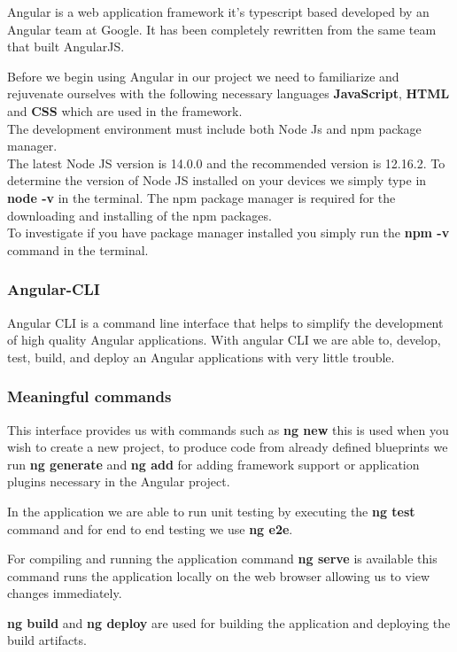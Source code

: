 \documentclass[a4paper,12pt]{report}
\begin{document}
Angular is a web application framework it's typescript based developed by an Angular team at Google.
It has been completely rewritten from the same team that built AngularJS.

Before we begin using Angular in our project we need to familiarize and rejuvenate ourselves with the following necessary languages \textbf{JavaScript}, \textbf{HTML} and \textbf{CSS} which are used in the framework.\\
The development environment must include both Node Js and npm package manager.\\
The latest Node JS version is 14.0.0 and the recommended version is 12.16.2. To determine the version of Node JS installed on your devices we simply type in \textbf{node -v} in the terminal.
The npm package manager is required for the downloading and installing of the npm packages.
\\To investigate if you have package manager installed you simply run the \textbf{npm -v} command in the terminal.\cite{angularSetup}

\subsubsection{Angular-CLI}
Angular CLI is a  command line interface that helps to simplify the development of high quality Angular applications. 
With angular CLI we are able to, develop, test, build, and deploy an Angular applications with very little trouble.

\subsubsection{Meaningful commands}

This interface provides us with commands such as \textbf{ng new} this is used when you wish to create a new project, to produce code from already defined blueprints we run \textbf{ng generate} and \textbf{ng add} for adding framework support or application plugins necessary in the Angular project.

In the application we are able to run unit testing by executing the \textbf{ng test} command and for end to end testing we use \textbf{ng e2e}.

For compiling and running the application command \textbf{ng serve} is available this command runs the application locally on the web browser allowing us to view changes immediately.

\textbf{ng build} and \textbf{ng deploy} are used for building the application and deploying the build artifacts.\cite{angularGuide} 
\end{document}
